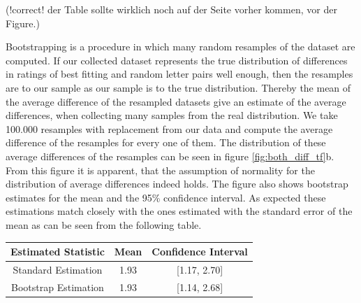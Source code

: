(!correct! der Table sollte wirklich noch auf der Seite vorher kommen, vor der Figure.)

Bootstrapping is a procedure in which many random resamples of the dataset are computed. If our collected dataset represents the true distribution of differences in ratings of best fitting and random letter pairs well enough, then the resamples are to our sample as our sample is to the true distribution. Thereby the mean of the average difference of the resampled datasets give an estimate of the average differences, when collecting many samples from the real distribution. We take 100.000 resamples with replacement from our data and compute the average difference of the resamples for every one of them. The distribution of these average differences of the resamples can be seen in figure \ref{fig:both_diff_tf}b. From this figure it is apparent, that the assumption of normality for the distribution of average differences indeed holds. The figure also shows bootstrap estimates for the mean and the 95\% confidence interval. As expected these estimations match closely with the ones estimated with the standard error of the mean as can be seen from the following table.

\centering
\begin{tabular}[t]{|c||c|c|}
	\hline 
	Estimated Statistic & Mean & Confidence Interval\tabularnewline
	\hline 
	\hline 
	Standard Estimation & 1.93 & [1.17, 2.70]\tabularnewline
	\hline 
	Bootstrap Estimation & 1.93 & [1.14, 2.68]\tabularnewline
	\hline
\end{tabular}

